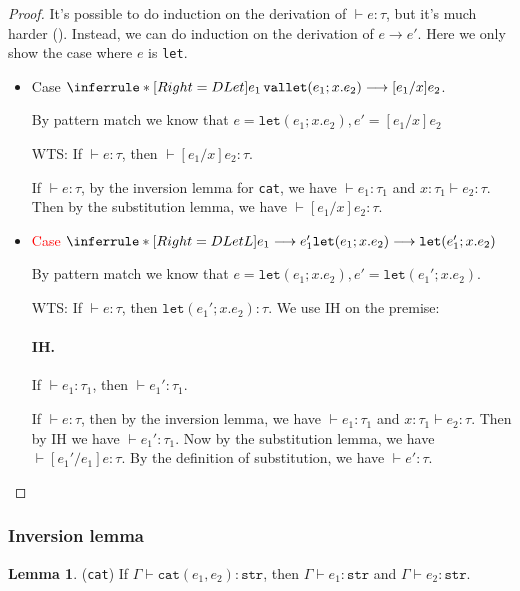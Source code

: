 \documentclass{article}
\theoremstyle{definition}
\newtheorem{lemma}{Lemma}[section]
\begin{document}
\begin{proof}
    It's possible to do induction on the derivation of $\vdash e:\tau$, but it's much harder (\cite{int}). Instead, we can do induction on the derivation of $e\longrightarrow e'$. Here we only show the case where $e$ is \texttt{let}.

    \begin{itemize}
        \item Case $\inferrule*[Right=DLet]{e_1\, \mathtt{val}}{\mathtt{let}(e_1;x.e_2) \longrightarrow [e_1/x]e_2}$.

              By pattern match we know that $e = \mathtt{let}(e_1;x.e_2), e' = [e_1/x]e_2$

              WTS: If $\vdash e:\tau$, then $\vdash [e_1/x]e_2: \tau$.

              If $\vdash e:\tau$, by the inversion lemma for \texttt{cat}, we have $\vdash e_1:\tau_1$ and $x:\tau_1 \vdash e_2:\tau$. Then by the substitution lemma, we have $\vdash [e_1/x]e_2: \tau$.
        \item \textcolor{red}{Case} $\inferrule*[Right=DLetL]{e_1\longrightarrow e_1'}{\mathtt{let}(e_1;x.e_2) \longrightarrow \mathtt{let}(e_1';x.e_2)}$

              By pattern match we know that $e= \mathtt{let}(e_1;x.e_2), e' = \mathtt{let}(e_1';x.e_2)$.

              WTS: If $\vdash e:\tau$, then $\mathtt{let}(e_1';x.e_2): \tau$.
              We use IH on the premise:
              \paragraph*{IH.} If $\vdash e_1:\tau_1$, then $\vdash e_1':\tau_1$.

              If $\vdash e:\tau$, then by the inversion lemma, we have $\vdash e_1:\tau_1$ and $x:\tau_1 \vdash e_2:\tau$. Then by IH we have $\vdash e_1':\tau_1$.
              Now by the substitution lemma, we have $\vdash [e_1'/e_1]e:\tau$. By the definition of substitution, we have $\vdash e': \tau$.
    \end{itemize}
\end{proof}

\subsubsection*{Inversion lemma}
\begin{lemma}
    (\texttt{cat}) If $\Gamma\vdash \mathtt{cat}(e_1,e_2):\mathtt{str}$, then $\Gamma \vdash e_1:\mathtt{str}$ and $\Gamma\vdash e_2:\mathtt{str}$.
\end{lemma}
\end{document}
